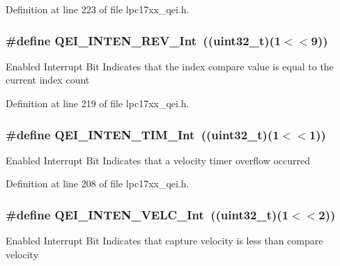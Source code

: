 \-Definition at line 223 of file lpc17xx\-\_\-qei.\-h.

\hypertarget{group___q_e_i___private___macros_gaf378442d79964f4470638b268cd8b646}{
\subsubsection[{\-Q\-E\-I\-\_\-\-I\-N\-T\-E\-N\-\_\-\-R\-E\-V\-\_\-\-Int}]{\setlength{\rightskip}{0pt plus 5cm}\#define {\bf \-Q\-E\-I\-\_\-\-I\-N\-T\-E\-N\-\_\-\-R\-E\-V\-\_\-\-Int}~((uint32\-\_\-t)(1$<$$<$9))}}\label{group___q_e_i___private___macros_gaf378442d79964f4470638b268cd8b646}
\-Enabled \-Interrupt \-Bit \-Indicates that the index compare value is equal to the current index count 

\-Definition at line 219 of file lpc17xx\-\_\-qei.\-h.

\hypertarget{group___q_e_i___private___macros_ga456a55634098e5d550471b2a4a78731d}{
\subsubsection[{\-Q\-E\-I\-\_\-\-I\-N\-T\-E\-N\-\_\-\-T\-I\-M\-\_\-\-Int}]{\setlength{\rightskip}{0pt plus 5cm}\#define {\bf \-Q\-E\-I\-\_\-\-I\-N\-T\-E\-N\-\_\-\-T\-I\-M\-\_\-\-Int}~((uint32\-\_\-t)(1$<$$<$1))}}\label{group___q_e_i___private___macros_ga456a55634098e5d550471b2a4a78731d}
\-Enabled \-Interrupt \-Bit \-Indicates that a velocity timer overflow occurred 

\-Definition at line 208 of file lpc17xx\-\_\-qei.\-h.

\hypertarget{group___q_e_i___private___macros_gacd30ec8a7938b765b03bbe626ee9fd9f}{
\subsubsection[{\-Q\-E\-I\-\_\-\-I\-N\-T\-E\-N\-\_\-\-V\-E\-L\-C\-\_\-\-Int}]{\setlength{\rightskip}{0pt plus 5cm}\#define {\bf \-Q\-E\-I\-\_\-\-I\-N\-T\-E\-N\-\_\-\-V\-E\-L\-C\-\_\-\-Int}~((uint32\-\_\-t)(1$<$$<$2))}}\label{group___q_e_i___private___macros_gacd30ec8a7938b765b03bbe626ee9fd9f}
\-Enabled \-Interrupt \-Bit \-Indicates that capture velocity is less than compare velocity 

